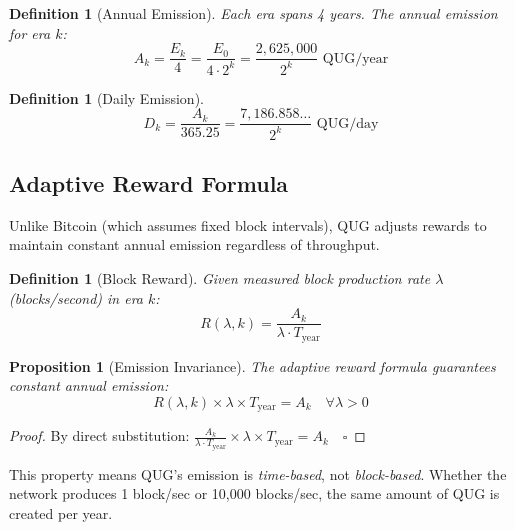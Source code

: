 \documentclass[11pt,a4paper]{article}
\newtheorem{proposition}[theorem]{Proposition}
\newtheorem{definition}[theorem]{Definition}
\begin{document}
\begin{definition}[Annual Emission]
Each era spans 4 years. The annual emission for era $k$:
\begin{equation}
    A_k = \frac{E_k}{4} = \frac{E_0}{4 \cdot 2^k} = \frac{2{,}625{,}000}{2^k} \text{ QUG/year}
\end{equation}
\end{definition}

\begin{definition}[Daily Emission]
\begin{equation}
    D_k = \frac{A_k}{365.25} = \frac{7{,}186.858\ldots}{2^k} \text{ QUG/day}
\end{equation}
\end{definition}

\subsection{Adaptive Reward Formula}

Unlike Bitcoin (which assumes fixed block intervals), QUG adjusts rewards to maintain constant annual emission regardless of throughput.

\begin{definition}[Block Reward]
Given measured block production rate $\lambda$ (blocks/second) in era $k$:
\begin{equation}
    R(\lambda, k) = \frac{A_k}{\lambda \cdot T_{\text{year}}}
\end{equation}
\end{definition}

\begin{proposition}[Emission Invariance]
The adaptive reward formula guarantees constant annual emission:
\begin{equation}
    R(\lambda, k) \times \lambda \times T_{\text{year}} = A_k \quad \forall \lambda > 0
\end{equation}
\end{proposition}

\begin{proof}
By direct substitution:
$\frac{A_k}{\lambda \cdot T_{\text{year}}} \times \lambda \times T_{\text{year}} = A_k \quad \square$
\end{proof}

This property means QUG's emission is \emph{time-based}, not \emph{block-based}. Whether the network produces 1 block/sec or 10,000 blocks/sec, the same amount of QUG is created per year.

\end{document}
